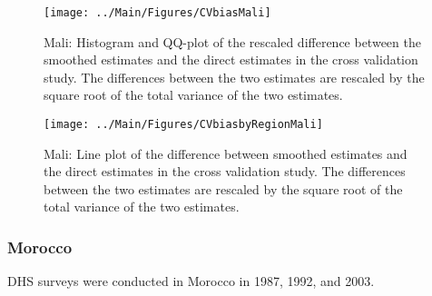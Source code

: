 \documentclass[12pt]{article}\usepackage[]{graphicx}\usepackage[]{color}
\newenvironment{knitrout}{}{} %
\begin{document}
\begin{knitrout}
\color{fgcolor}\begin{figure}[bht]

{\centering \texttt{[image: ../Main/Figures/CVbiasMali]} 

}

\caption[Mali]{Mali: Histogram and QQ-plot of the rescaled difference between the smoothed estimates and the direct estimates in the cross validation study. The differences between the two estimates are rescaled by the square root of the total variance of the two estimates.}\label{fig:unnamed-chunk-219}
\end{figure}


\end{knitrout}

\begin{knitrout}
\color{fgcolor}\begin{figure}[bht]

{\centering \texttt{[image: ../Main/Figures/CVbiasbyRegionMali]} 

}

\caption[Mali]{Mali: Line plot of the difference between smoothed estimates and the direct estimates in the cross validation study. The differences between the two estimates are rescaled by the square root of the total variance of the two estimates.}\label{fig:unnamed-chunk-220}
\end{figure}


\end{knitrout}


\clearpage
\subsubsection{Morocco}





DHS surveys were conducted in Morocco in 1987, 1992, and 2003.
\end{document}
